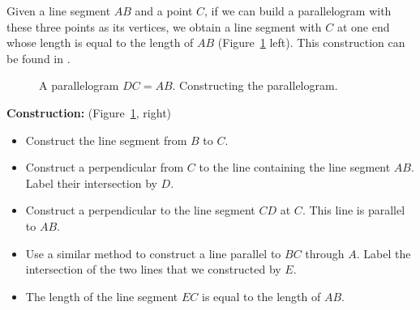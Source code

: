 \documentclass[11pt,a4paper]{article}
\begin{document}
Given a line segment $AB$ and a point $C$, if we can build a parallelogram with these three points as its vertices, we obtain a line segment with $C$ at one end whose length is equal to the length of $AB$ (Figure~\ref{fig.parallel-1} left). This construction can be found in \cite[pp. 207--208]{roads}.
\begin{figure}[H]
\begin{center}
\caption{A parallelogram $DC=AB$. Constructing the parallelogram.}\label{fig.parallel-1}
\end{center}
\end{figure}
\vspace*{-4ex}
\textbf{Construction:} (Figure~\ref{fig.parallel-1}, right)
\begin{itemize}
\item Construct the line segment from $B$ to $C$.
\item Construct a perpendicular from $C$ to the line containing the line segment $AB$. Label their intersection by $D$.
\item Construct a perpendicular to the line segment $CD$ at $C$. This line is parallel to $AB$.
\item Use a similar method to construct a line parallel to $BC$ through $A$. Label the intersection of the two lines that we constructed by $E$.
\item The length of the line segment $EC$ is equal to the length of $AB$.
\end{itemize}
\end{document}

